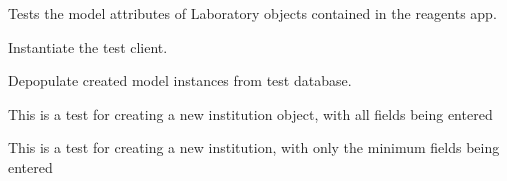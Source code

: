 \documentclass[letterpaper,10pt,english]{sphinxmanual}
\begin{document}
\begin{fulllineitems}
\label{api:experimentdb.sharing.tests.InstitutionModelTests}
Tests the model attributes of Laboratory objects contained in the reagents app.


\begin{fulllineitems}
\label{api:experimentdb.sharing.tests.InstitutionModelTests.setUp}
Instantiate the test client.


\end{fulllineitems}


\begin{fulllineitems}
\label{api:experimentdb.sharing.tests.InstitutionModelTests.tearDown}
Depopulate created model instances from test database.


\end{fulllineitems}


\begin{fulllineitems}
\label{api:experimentdb.sharing.tests.InstitutionModelTests.test_create_institution_all_fields}
This is a test for creating a new institution object, with all fields being entered


\end{fulllineitems}


\begin{fulllineitems}
\label{api:experimentdb.sharing.tests.InstitutionModelTests.test_create_institution_minimal}
This is a test for creating a new institution, with only the minimum fields being entered


\end{fulllineitems}


\end{fulllineitems}
\end{document}
